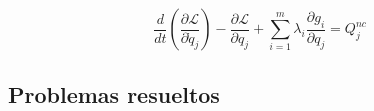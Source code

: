 \documentclass[/home/hernan/Documentos/Apuntes_mecanica_teorica/main.tex]{subfiles}
\begin{document}
    \begin{definition}
        \begin{equation}
            \frac{d}{d t} \left(\frac{\partial \mathcal{L} }{\partial \dot{q}_{j}} \right) - \frac{\partial \mathcal{L}}{\partial q_{j}} + \sum_{i=1}^{m}\lambda_{i} \frac{\partial g_{i}}{\partial q_{j}}=  Q_{j}^{nc}
        \end{equation}
    \end{definition}


    \subsection{Problemas resueltos}
    
\end{document}
